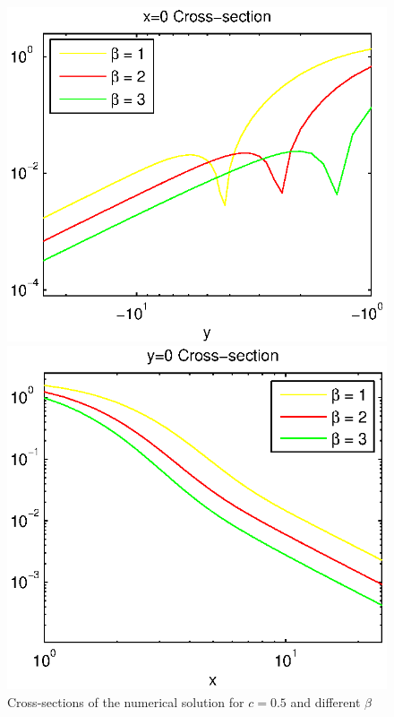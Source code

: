 \documentclass[preprint]{elsarticle}
\begin{document}
\begin{figure}[ht]
\begin{minipage}[b]{0.5\linewidth}
		\includegraphics[width=\linewidth]{cross-sections/c=05beta=1__3Logx=0.eps}
	\end{minipage}	
	\begin{minipage}[b]{0.5\linewidth}
		\raggedright
		 \includegraphics[width=\linewidth]{cross-sections/c=05beta=1__3Logy=0.eps}
	\end{minipage}
	\caption{Cross-sections of the numerical solution for $c=0.5$ and different $\beta$}
	\label{profilesBetaVarying}
\end{figure}
\end{document}
